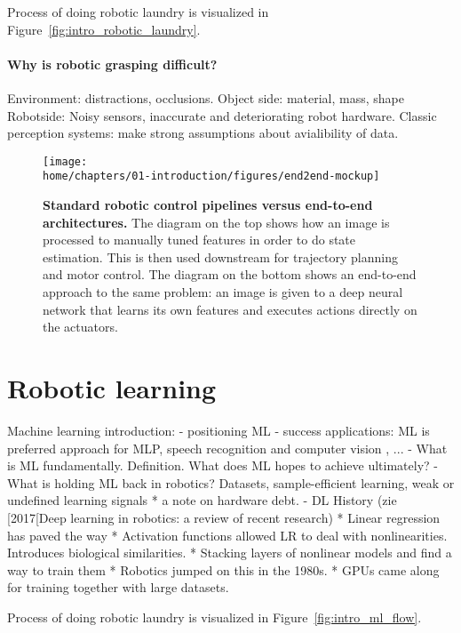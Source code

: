 \documentclass[\home/main.tex]{subfiles}
\begin{document}
Process of doing robotic laundry is visualized in Figure~\ref{fig:intro_robotic_laundry}.


\paragraph{Why is robotic grasping difficult?}
Environment: distractions, occlusions.
Object side: material, mass, shape
Robotside: Noisy sensors, inaccurate and deteriorating robot hardware.
Classic perception systems: make strong assumptions about avialibility of data. 

\begin{figure}
    \texttt{[image: \\home/chapters/01-introduction/figures/end2end-mockup]}
    \caption{\textbf{Standard robotic control pipelines versus end-to-end architectures.} The diagram on the top shows how an image is processed to manually tuned features in order to do state estimation. This is then used downstream for trajectory planning and motor control. The diagram on the bottom shows an end-to-end approach to the same problem: an image is given to a deep neural network that learns its own features and executes actions directly on the actuators.}
    \label{fig:intro_end2end}
\end{figure}

\section{Robotic learning}
Machine learning introduction:
    - positioning ML %
    - success applications: ML is preferred approach for MLP, speech recognition and computer vision , ... 
    - What is ML fundamentally. Definition. What does ML hopes to achieve ultimately? 
    - What is holding ML back in robotics? 
        Datasets, sample-efficient learning, weak or undefined learning signals 
        * a note on hardware debt.
    - DL History    (zie [2017[Deep learning in robotics: a review of recent research)
        * Linear regression has paved the way 
        * Activation functions allowed LR to deal with nonlinearities. Introduces biological similarities. 
        * Stacking layers of nonlinear models and find a way to train them
        * Robotics jumped on this in the 1980s.
        * GPUs came along for training together with large datasets. 


Process of doing robotic laundry is visualized in Figure~\ref{fig:intro_ml_flow}.

\end{document}
